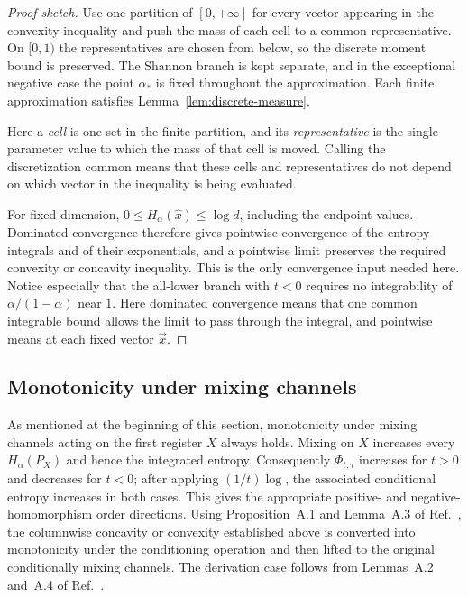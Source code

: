 \documentclass[aps,pra,11pt,onecolumn,nofootinbib,tightenlines]{revtex4-2}
\theoremstyle{definition}
\newcommand{\ParameterMainLift}{Proposition~A.1 and Lemma~A.3 of Ref.~\cite{rubboli2026complete}}
\newcommand{\ParameterMainDerivationLift}{Lemmas~A.2 and~A.4 of Ref.~\cite{rubboli2026complete}}
\begin{document}
\begin{proof}[Proof sketch]
Use one partition of $[0,+\infty]$ for every vector appearing in the convexity
inequality and push the mass of each cell to a common representative.  On
$[0,1)$ the representatives are chosen from below, so the discrete moment bound
is preserved.  The Shannon branch is kept separate, and in the exceptional
negative case the point $\alpha_*$ is fixed throughout the approximation.  Each
finite approximation satisfies Lemma~\ref{lem:discrete-measure}.

Here a \emph{cell} is one set in the finite partition, and its
\emph{representative} is the single parameter value to which the mass of that
cell is moved.  Calling the discretization common means that these cells and
representatives do not depend on which vector in the inequality is being
evaluated.

For fixed dimension, $0\leq H_\alpha(\hat{x})\leq\log d$, including the endpoint
values.  Dominated convergence therefore gives pointwise convergence of the
entropy integrals and of their exponentials, and a pointwise limit preserves the
required convexity or concavity inequality.  This is the only convergence input
needed here.  Notice especially that the all-lower branch with $t<0$ requires no
integrability of $\alpha/(1-\alpha)$ near $1$.
Here dominated convergence means that one common integrable bound allows the
limit to pass through the integral, and pointwise means at each fixed vector
$\vec{x}$.
\end{proof}

\subsection{Monotonicity under mixing channels}
\label{sec:mixing-channels}

As mentioned at the beginning of this section, monotonicity under mixing channels
acting on the first register $X$ always holds.  Mixing on $X$ increases every
$H_\alpha(P_X)$ and hence the integrated entropy.  Consequently
$\Phi_{t,\tau}$ increases for $t>0$ and decreases for $t<0$; after applying
$(1/t)\log$, the associated conditional entropy increases in both cases.  This
gives the appropriate positive- and negative-homomorphism order directions.
Using \ParameterMainLift, the columnwise concavity or convexity established above
is converted into monotonicity under the conditioning operation and then lifted to
the original conditionally mixing channels.  The derivation case follows from
\ParameterMainDerivationLift.
\end{document}
